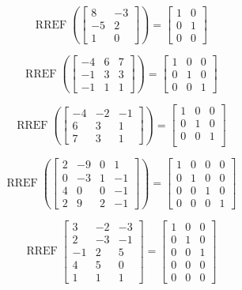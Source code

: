 \documentclass{article}
\DeclareMathOperator{\RREF}{RREF}
\begin{document}
	

\[\RREF\left(\begin{bmatrix}
8 & -3 \\
-5 & 2 \\
1 & 0
\end{bmatrix}\right)=
\begin{bmatrix} 
1 & 0 \\
0 & 1 \\
0 & 0
\end{bmatrix}\]


\[\RREF\left(\begin{bmatrix}
-4 & 6 & 7\\
-1 & 3 & 3\\
-1 & 1 & 1
\end{bmatrix}\right)=
\begin{bmatrix} 
1 & 0 & 0\\
0 & 1 & 0\\
0 & 0 & 1
\end{bmatrix}\]



\[\RREF\left(\begin{bmatrix}
-4 & -2 & -1\\
6 & 3 & 1\\
7 & 3 & 1
\end{bmatrix}\right)=
\begin{bmatrix}
1& 0 & 0\\
0& 1 &0\\
0 & 0 & 1\\
\end{bmatrix} \]




\[\RREF\left(\begin{bmatrix}
2 & -9 & 0 & 1 \\
0 & -3 & 1 & -1\\
4 & 0 & 0 & -1\\
2 & 9 & 2 & -1
\end{bmatrix}\right)=
\begin{bmatrix} 
1 & 0 & 0 & 0\\
0 & 1 & 0 & 0\\
0 & 0 & 1 & 0 \\
0 & 0 & 0 & 1
\end{bmatrix}\]



\[
  \RREF\begin{bmatrix}
    3 &  -2 & -3 \\
    2 & -3 & -1 \\
    -1 & 2 & 5 \\
    4 & 5 & 0 \\
    1 & 1 & 1
  \end{bmatrix} =
  \begin{bmatrix}
    1 & 0 & 0\\
    0 & 1 & 0\\
    0 & 0 & 1\\
    0 & 0 & 0\\
    0 & 0 & 0
  \end{bmatrix}
\]
\end{document}
